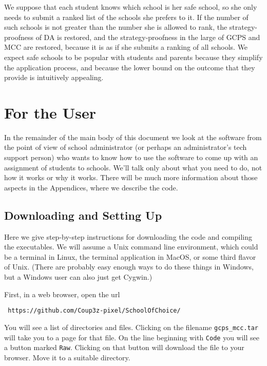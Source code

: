 \documentclass[12pt]{article}
\theoremstyle{definition}
\begin{document}
We suppose that each student knows which school is her safe school, so
she only needs to submit a ranked list of the schools she prefers to
it. If the number of such schools is not greater than the number she
is allowed to rank, the strategy-proofness of DA is restored, and the
strategy-proofness in the large of GCPS and MCC are restored, because
it is as if she submits a ranking of all schools.  We expect safe
schools to be popular with students and parents because they simplify
the application process, and because the lower bound on the outcome
that they provide is intuitively appealing.

\section{For the User}

In the remainder of the main body of this document we look at the
software from the point of view of school administrator (or perhaps an
administrator's tech support person) who wants to know how to use the
software to come up with an assignment of students to schools.  We'll
talk only about what you need to do, not how it works or why it works.
There will be much more information about those aspects in the
Appendices, where we describe the code.

\subsection{Downloading and Setting Up} \label{subsec:DownloadInstall}

Here we give step-by-step instructions for downloading the code and
compiling the executables.  We will assume a Unix command line
environment, which could be a terminal in Linux, the terminal
application in MacOS, or some third flavor of Unix.  (There are
probably easy enough ways to do these things in Windows, but a Windows
user can also just get Cygwin.)

First, in a web browser, open the url
\begin{obeylines}
  \texttt{
    https://github.com/Coup3z-pixel/SchoolOfChoice/
    }
\end{obeylines}

\bigskip \noindent You will see a list of directories and files.
Clicking on the filename \texttt{gcps\_mcc.tar} will take you to a
page for that file.  On the line beginning with \texttt{Code} you will
see a button marked \texttt{Raw}.  Clicking on that button will
download the file to your browser.  Move it to a suitable directory.
\end{document}

